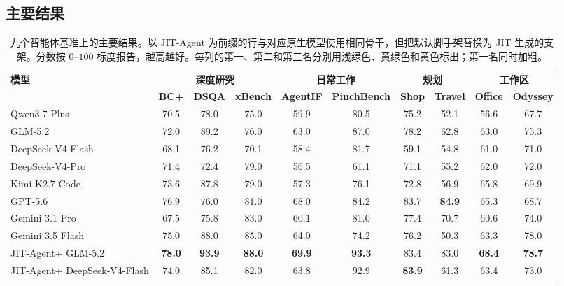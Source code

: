 \documentclass{article}
\newcommand{\ourmethod}{JIT-Agent\xspace}
\newcommand{\topone}[1]{\cellcolor{toponecell}\textbf{#1}}
\newcommand{\toptwo}[1]{\cellcolor{toptwocell}#1}
\newcommand{\topthree}[1]{\cellcolor{topthreecell}#1}
\begin{document}
\vspace{-0.5em}
\subsection{主要结果}
\vspace{-0.5em}

\newcommand{\resultblank}{\textemdash}

\begin{table}[!t]
\centering
\setlength{\tabcolsep}{3.2pt}
\renewcommand{\arraystretch}{1.12}
\caption{九个智能体基准上的主要结果。以 \ourmethod 为前缀的行与对应原生模型使用相同骨干，但把默认脚手架替换为 JIT 生成的支架。分数按 $0$--$100$ 标度报告，越高越好。每列的第一、第二和第三名分别用浅绿色、黄绿色和黄色标出；第一名同时加粗。}
\label{tab:main_results_vanilla}
\begin{adjustbox}{max width=\textwidth}
\begin{tabular}{lccccccccc}
\toprule
\textbf{模型} & \multicolumn{3}{c}{\textbf{深度研究}} & \multicolumn{2}{c}{\textbf{日常工作}} & \multicolumn{2}{c}{\textbf{规划}} & \multicolumn{2}{c}{\textbf{工作区}} \\
\cmidrule(lr){2-4}\cmidrule(lr){5-6}\cmidrule(lr){7-8}\cmidrule(lr){9-10}
 & \textbf{BC+} & \textbf{DSQA} & \textbf{xBench} & \textbf{AgentIF} & \textbf{PinchBench} & \textbf{Shop} & \textbf{Travel} & \textbf{Office} & \textbf{Odyssey} \\
\midrule
Qwen3.7-Plus & 70.5 & 78.0& 75.0 & 59.9 & 80.5 & 75.2 & 52.1 & 56.6& 67.7\\
GLM-5.2 & 72.0 & \toptwo{89.2}& 76.0 & 63.0 & \topthree{87.0} & 78.2 & 62.8 & 63.0& \topthree{75.3}\\
DeepSeek-V4-Flash & 68.1 & 76.2 & 70.1 & 58.4 & 81.7 & 59.1 & 54.8 & 61.0 & 71.0 \\
DeepSeek-V4-Pro & 71.4 & 72.4& 79.0 & 56.5 & 61.1 & 71.1 & 55.2 & 62.0 & 72.0 \\
Kimi K2.7 Code & 73.6 & 87.8 & 79.0 & 57.3 & 76.1 & 72.8 & 56.9 & \toptwo{65.8}& 69.9 \\
GPT-5.6 &  \toptwo{76.9} & 76.0& 81.0 & \toptwo{68.0}& 84.2 & \toptwo{83.7} & \topone{84.9} & \topthree{65.3}& 68.7\\
Gemini 3.1 Pro & 67.5 & 75.8& \topthree{83.0} & 60.1& 81.0 & 77.4 & \topthree{70.7} & 60.6& 74.0\\
Gemini 3.5 Flash & \topthree{75.0} & \topthree{88.0}& \toptwo{85.0} & \topthree{64.0}& 74.2 & 76.2 & 50.3 & 63.3& \toptwo{78.0}\\
\midrule
\ourmethod + GLM-5.2 & \topone{78.0} & \topone{93.9}& \topone{88.0} & \topone{69.9} & \topone{93.3} & \topthree{83.4} & \toptwo{83.0} & \topone{68.4} & \topone{78.7} \\
\ourmethod + DeepSeek-V4-Flash & 74.0 & 85.1 & 82.0 & 63.8 & \toptwo{92.9} & \topone{83.9} & 61.3 & 63.4 & 73.0 \\
\bottomrule
\end{tabular}
\end{adjustbox}
\end{table}
\end{document}
